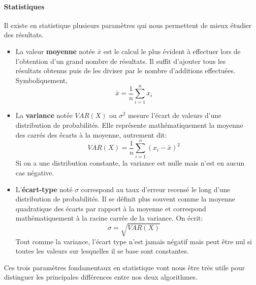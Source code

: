\documentclass[12pt,twoside, openright]{memoir}
\begin{document}
	\paragraph*{Statistiques} Il existe en statistique plusieurs paramètres qui nous permettent de mieux étudier des résultats.
	\begin{itemize}
		\item La valeur \textbf{moyenne} notée $\bar{x}$ est le calcul le plus évident à effectuer lors de l'obtention d'un grand nombre de résultats. Il suffit d'ajouter tous les résultats obtenus puis de les diviser par le nombre d'additions effectuées. Symboliquement,
		\begin{equation}\bar{x}=\frac{1}{n}\sum_{i=1}^n x_i\end{equation}
		\item La \textbf{variance} notée $VAR(X)$ ou $\sigma^2$ mesure l'écart de valeurs d'une distribution de probabilités. Elle représente mathématiquement la moyenne des carrés des écarts à la moyenne, autrement dit:
		\begin{equation}VAR(X)=\frac{1}{n}\sum_{i=1}^n(x_i-\bar{x})^2\end{equation}
		Si on a une distribution constante, la variance est nulle mais n'est en aucun cas négative.
		\item L'\textbf{écart-type} noté $\sigma$ correspond au taux d'erreur recensé le long d'une distribution de probabilités. Il se définit plus souvent comme la moyenne quadratique des écarts par rapport à la moyenne et correspond mathématiquement à la racine carrée de la variance. On écrit:
		\begin{equation}\sigma=\sqrt{VAR(X)}\end{equation}
		Tout comme la variance, l'écart type n'est jamais négatif mais peut être nul si toutes les valeurs sur lesquelles il se base sont constantes.
	\end{itemize}\par
	Ces trois paramètres fondamentaux en statistique vont nous être très utile pour distinguer les principales différences entre nos deux algorithmes.
\end{document}
